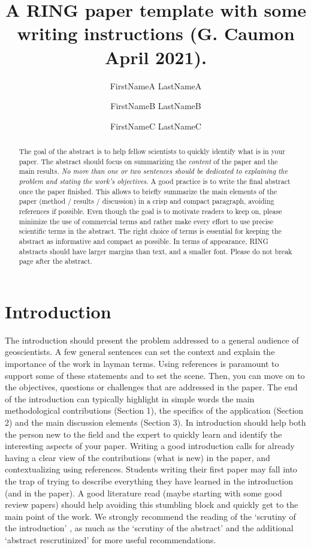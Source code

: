 \documentclass[final]{ring}
\title{A RING paper template with some writing instructions \newline (G. Caumon April 2021).}
\author[1]{FirstNameA LastNameA}
\author[2]{FirstNameB LastNameB}
\author[1,2]{FirstNameC LastNameC}
\affil[1]{RING, GeoRessources / ENSG, Université de Lorraine / CNRS, F-54000 Nancy}
\affil[2]{Team, Laboratory, Organization, Zip code, Country}
\begin{document}
\maketitle

\begin{abstract}

The goal of the abstract is to help fellow scientists to quickly identify what is in your paper. The abstract should focus on summarizing the \emph{content} of the paper and the main results. \emph{No more than one or two sentences should be dedicated to explaining the problem and stating the work’s objectives}. A good practice is to write the final abstract once the paper finished. This allows to briefly summarize the main elements of the paper (method / results / discussion) in a crisp and compact paragraph, avoiding references if possible. Even though the goal is to motivate readers to keep on, please minimize the use of commercial terms and rather make every effort to use precise scientific terms in the abstract. The right choice of terms is essential for keeping the abstract as informative and compact as possible. In terms of appearance, RING abstracts should have larger margins than text, and a smaller font. Please do not break page after the abstract.

\end{abstract}


\section*{Introduction}

The introduction should present the problem addressed to a general audience of geoscientists. A few general sentences can set the context and explain the importance of the work in layman terms. Using references is paramount to support some of these statements and to set the scene. Then, you can move on to the objectives, questions or challenges that are addressed in the paper. The end of the introduction can typically highlight in simple words the main methodological contributions (Section 1), the specifics of the application (Section 2) and the main discussion elements (Section 3). 
In introduction should help both the person new to the field and the expert to quickly learn and identify the interesting aspects of your paper. Writing a good introduction calls for already having a clear view of the contributions (what is new) in the paper, and contextualizing using references. Students writing their first paper may fall into the trap of trying to describe everything they have learned in the introduction (and in the paper). A good literature read (maybe starting with some good review papers) should help avoiding this stumbling block and quickly get to the main point of the work. We strongly recommend the reading of the `scrutiny of the introduction' \citep{Claerbout1988S}, as much as the `scrutiny of the abstract' \citep{Landes1966BAAPG} and the additional `abstract rescrutinized' \citep{Lowman1998G} for more useful recommendations.
\end{document}
